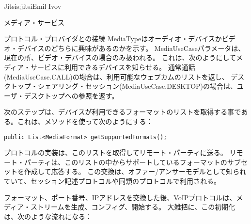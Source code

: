\begin{aosachapter}{Jitsi}{s:jitsi}{Emil Ivov}
\begin{aosasect1}{メディア・サービス}
\begin{aosasect2}{プロトコル・プロバイダとの接続}
\noindent MediaTypeはオーディオ・デバイスかビデオ・デバイスのどちらに興味があるのかを示す。
MediaUseCaseパラメータは、現在の所、ビデオ・デバイスの場合のみ扱われる。
これは、次のようにしてメディア・サービスに利用できるデバイスを知らせる。
通常通話(MediaUseCase.CALL)の場合は、利用可能なウェブカムのリストを返し、
デスクトップ・シェアリング・セッション(MediaUseCase.DESKTOP)の場合は、ユーザ・デスクトップへの参照を返す。

次のステップは、デバイスが利用できるフォーマットのリストを取得する事である。これは、メソッドを使って次のようにする：

\begin{verbatim}
public List<MediaFormat> getSupportedFormats();
\end{verbatim}

\noindent プロトコルの実装は、このリストを取得してリモート・パーティに送る。
リモート・パーティは、このリストの中からサポートしているフォーマットのサブセットを作成して応答する。
この交換は、オファー/アンサーモデルとして知られていて、セッション記述プロトコルや同類のプロトコルで利用される。

フォーマット、ポート番号、IPアドレスを交換した後、VoIPプロトコルは、メディア・ストリームを生成、コンフィグ、開始する。
大雑把に、この初期化は、次のような流れになる：



\end{aosasect2}
\end{aosasect1}
\end{aosachapter}
